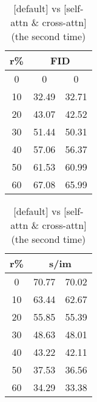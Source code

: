 \begin{table}[htp]
\caption{[default] vs [self-attn \& cross-attn] (the second time)}
\label{table:exp_1_4}
    \begin{minipage}{0.48\textwidth}
        \centering
        \begin{tabular}{|c||c|c|}
            \hline
            \multicolumn{1}{|c||}{r\%} & \multicolumn{2}{c|}{FID}\\
            \hline
            0 & 0 & 0 \\
            10 & 32.49 & 32.71 \\
            20 & 43.07 & 42.52 \\
            30 & 51.44 & 50.31 \\
            40 & 57.06 & 56.37 \\
            50 & 61.53 & 60.99 \\
            60 & 67.08 & 65.99 \\
            \hline
        \end{tabular}
    \end{minipage}
    \hfill
    \begin{minipage}{0.48\textwidth}
        \centering
        \begin{tabular}{|c||c|c|}
            \hline
            \multicolumn{1}{|c||}{r\%} & \multicolumn{2}{c|}{s/im}\\
            \hline
            0 & 70.77 & 70.02 \\
            10 & 63.44 & 62.67 \\
            20 & 55.85 & 55.39 \\
            30 & 48.63 & 48.01 \\
            40 & 43.22 & 42.11 \\
            50 & 37.53 & 36.56 \\
            60 & 34.29 & 33.38 \\
            \hline
        \end{tabular}
    \end{minipage}
\end{table}